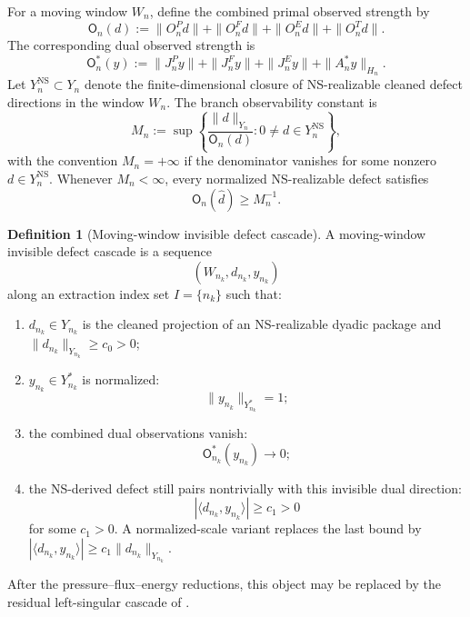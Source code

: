 \documentclass[11pt]{article}
\numberwithin{equation}{section}
\theoremstyle{plain}
\theoremstyle{definition}
\newtheorem{definition}[theorem]{Definition}
\theoremstyle{remark}
\newcommand{\NS}{\mathrm{NS}}
\begin{document}
For a moving window \(W_n\), define the combined primal observed strength by
\begin{equation}
        \mathsf O_n(d)
        :=
        \|O^P_nd\|+
        \|O^F_nd\|+
        \|O^E_nd\|+
        \|O^T_nd\|.
        \label{eq:combined-primal-strength}
\end{equation}
The corresponding dual observed strength is
\begin{equation}
        \mathsf O_n^*(y)
        :=
        \|J^P_ny\|+
        \|J^F_ny\|+
        \|J^E_ny\|+
        \|A_n^*y\|_{H_n}.
        \label{eq:combined-dual-strength}
\end{equation}
Let \(Y_n^{\NS}\subset Y_n\) denote the finite-dimensional closure of
NS-realizable cleaned defect directions in the window \(W_n\).  The branch
observability constant is
\begin{equation}
        M_n
        :=
        \sup\left\{
        \frac{\|d\|_{Y_n}}{\mathsf O_n(d)}:
        0\ne d\in Y_n^{\NS}
        \right\},
        \label{eq:branch-observability-constant}
\end{equation}
with the convention \(M_n=+\infty\) if the denominator vanishes for some
nonzero \(d\in Y_n^{\NS}\).  Whenever \(M_n<\infty\), every normalized
NS-realizable defect satisfies
\begin{equation}
        \mathsf O_n(\widehat d)\ge M_n^{-1}.
        \label{eq:observability-lower-bound}
\end{equation}

\begin{definition}[Moving-window invisible defect cascade]
\label{def:moving-window-invisible-cascade-final}
A moving-window invisible defect cascade is a sequence
\[
        (W_{n_k},d_{n_k},y_{n_k})
\]
along an extraction index set \(I=\{n_k\}\) such that:
\begin{enumerate}
\item \(d_{n_k}\in Y_{n_k}\) is the cleaned projection of an NS-realizable dyadic
package and \(\|d_{n_k}\|_{Y_{n_k}}\ge c_0>0\);
\item \(y_{n_k}\in Y_{n_k}^*\) is normalized:
\[
        \|y_{n_k}\|_{Y_{n_k}^*}=1;
\]
\item the combined dual observations vanish:
\[
        \mathsf O_{n_k}^*(y_{n_k})\to0;
\]
\item the NS-derived defect still pairs nontrivially with this invisible dual
direction:
\[
        |\langle d_{n_k},y_{n_k}\rangle|\ge c_1>0
\]
for some \(c_1>0\).  A normalized-scale variant replaces the last bound by
\(|\langle d_{n_k},y_{n_k}\rangle|\ge c_1\|d_{n_k}\|_{Y_{n_k}}\).
\end{enumerate}
After the pressure--flux--energy reductions, this object may be replaced by the
residual left-singular cascade of .
\end{definition}
\end{document}
